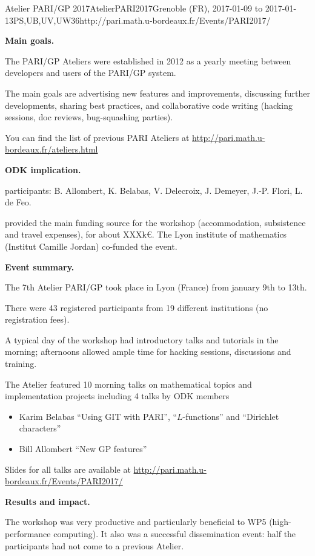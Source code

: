 \begin{event}{Atelier PARI/GP 2017}{AtelierPARI2017}{Grenoble (FR),
2017-01-09 to 2017-01-13}{PS,UB,UV,UW}{36}{http://pari.math.u-bordeaux.fr/Events/PARI2017/}

\textbf{Main goals.}

The PARI/GP Ateliers were established in 2012 as a yearly meeting
between developers and users of the PARI/GP system.

The main goals are advertising new features and improvements,
discussing further developments, sharing best practices, and collaborative
code writing (hacking sessions, doc reviews, bug-squashing parties).

You can find the list of previous PARI Ateliers at
\url{http://pari.math.u-bordeaux.fr/ateliers.html}

\textbf{ODK implication.} 

\ODK participants: B. Allombert, K. Belabas, V. Delecroix, J. Demeyer,
J.-P. Flori, L. de Feo.

\ODK provided the main funding source for the workshop (accommodation,
subsistence and travel expenses), for about XXXk\euro. The Lyon
institute of mathematics (Institut Camille Jordan) co-funded the event.

\textbf{Event summary.} 

The 7th Atelier PARI/GP took place in Lyon (France) from january
9th to 13th.

There were 43 registered participants from 19 different institutions
(no registration fees).

A typical day of the workshop had introductory talks and tutorials
in the morning; afternoons allowed ample time for hacking sessions,
discussions and training.

The Atelier featured 10 morning talks on mathematical topics and
implementation projects including 4 talks by ODK members
\begin{itemize}
\item Karim Belabas ``Using GIT with PARI'', ``$L$-functions'' and
  ``Dirichlet characters''
\item Bill Allombert ``New GP features''
\end{itemize}

Slides for all talks are available at
\url{http://pari.math.u-bordeaux.fr/Events/PARI2017/}

\textbf{Results and impact.} 

The workshop was very productive and particularly beneficial to WP5
(high-performance computing). It also was a successful dissemination event: half
  the participants had not come to a previous Atelier.

\end{event}
